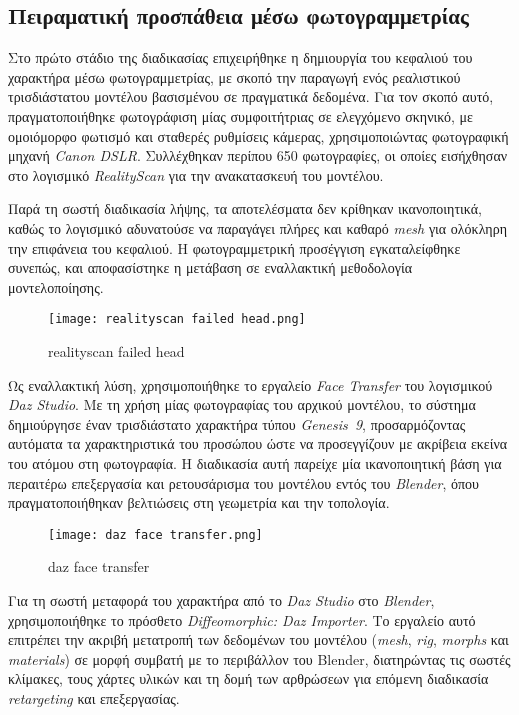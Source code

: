 \subsection{Πειραματική προσπάθεια μέσω φωτογραμμετρίας}

Στο πρώτο στάδιο της διαδικασίας επιχειρήθηκε η δημιουργία του κεφαλιού του χαρακτήρα μέσω φωτογραμμετρίας, 
με σκοπό την παραγωγή ενός ρεαλιστικού τρισδιάστατου μοντέλου βασισμένου σε πραγματικά δεδομένα. 
Για τον σκοπό αυτό, πραγματοποιήθηκε φωτογράφιση μίας συμφοιτήτριας σε ελεγχόμενο σκηνικό, 
με ομοιόμορφο φωτισμό και σταθερές ρυθμίσεις κάμερας, χρησιμοποιώντας φωτογραφική μηχανή 
\textit{Canon DSLR}. Συλλέχθηκαν περίπου 650 φωτογραφίες, οι οποίες εισήχθησαν στο λογισμικό 
\textit{RealityScan} για την ανακατασκευή του μοντέλου.

Παρά τη σωστή διαδικασία λήψης, τα αποτελέσματα δεν κρίθηκαν ικανοποιητικά, 
καθώς το λογισμικό αδυνατούσε να παραγάγει πλήρες και καθαρό \textit{mesh} 
για ολόκληρη την επιφάνεια του κεφαλιού. 
Η φωτογραμμετρική προσέγγιση εγκαταλείφθηκε συνεπώς, 
και αποφασίστηκε η μετάβαση σε εναλλακτική μεθοδολογία μοντελοποίησης.

\begin{figure}[H]
    \centering
    \texttt{[image: realityscan failed head.png]}
    \caption{realityscan failed head}
    \label{fig:placeholder}
\end{figure}

Ως εναλλακτική λύση, χρησιμοποιήθηκε το εργαλείο \textit{Face Transfer} του λογισμικού 
\textit{Daz Studio}. Με τη χρήση μίας φωτογραφίας του αρχικού μοντέλου, 
το σύστημα δημιούργησε έναν τρισδιάστατο χαρακτήρα τύπου \textit{Genesis~9}, 
προσαρμόζοντας αυτόματα τα χαρακτηριστικά του προσώπου ώστε να προσεγγίζουν 
με ακρίβεια εκείνα του ατόμου στη φωτογραφία. 
Η διαδικασία αυτή παρείχε μία ικανοποιητική βάση για περαιτέρω επεξεργασία 
και ρετουσάρισμα του μοντέλου εντός του \textit{Blender}, 
όπου πραγματοποιήθηκαν βελτιώσεις στη γεωμετρία και την τοπολογία.

\begin{figure}[H]
    \centering
    \texttt{[image: daz face transfer.png]}
    \caption{daz face transfer}
    \label{fig:placeholder}
\end{figure}
Για τη σωστή μεταφορά του χαρακτήρα από το \textit{Daz Studio} στο \textit{Blender}, 
χρησιμοποιήθηκε το πρόσθετο \textit{Diffeomorphic: Daz Importer}. 
Το εργαλείο αυτό επιτρέπει την ακριβή μετατροπή των δεδομένων του μοντέλου 
(\textit{mesh}, \textit{rig}, \textit{morphs} και \textit{materials}) σε μορφή 
συμβατή με το περιβάλλον του Blender, διατηρώντας τις σωστές κλίμακες, 
τους χάρτες υλικών και τη δομή των αρθρώσεων για επόμενη διαδικασία 
\textit{retargeting} και επεξεργασίας. 

